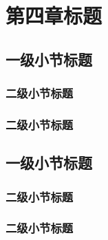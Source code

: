 \chapter{第四章标题}

\section{一级小节标题}

\subsection{二级小节标题}


\subsection{二级小节标题}


\section{一级小节标题}

\subsection{二级小节标题}


\subsection{二级小节标题}

